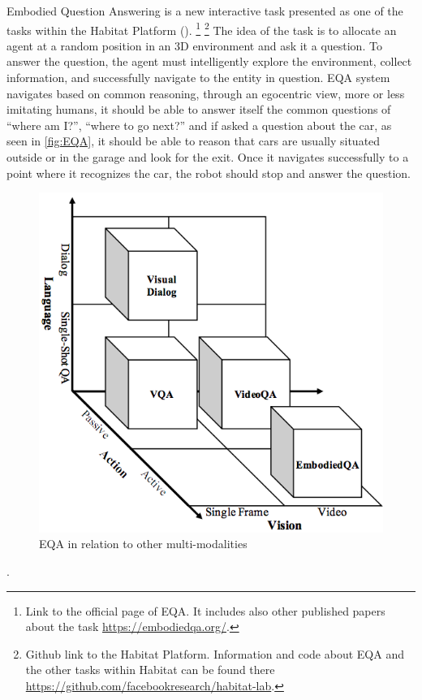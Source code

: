 Embodied Question Answering is a new interactive task presented as one of the tasks within the Habitat Platform (\cite{embodiedqa}). \footnote{Link to the official page of EQA. It includes also other published papers about the task \url{https://embodiedqa.org/}.} \footnote{Github link to the Habitat Platform. Information and code about EQA and the other tasks within Habitat can be found there \url{https://github.com/facebookresearch/habitat-lab}.} The idea of the task is to allocate an agent at a random position in an  3D environment and ask it a question. To answer the question, the agent must intelligently explore the environment, collect information, and successfully navigate to the entity in question. EQA system navigates based on common reasoning, through an egocentric view, more or less imitating humans, it should be able to answer itself the common questions of “where am I?”, “where to go next?” and if asked a question about the car, as seen in \ref{fig:EQA}, it should be able to reason that cars are usually situated outside or in the garage and look for the exit. Once it navigates successfully to a point where it recognizes the car, the robot should stop and answer the question.  


\begin{figure}[H]
\centering
\includegraphics[scale=0.3]{images/Vision-language.png}
\caption{EQA in relation to other multi-modalities}
\label{fig:multimodal}
\end{figure}.


